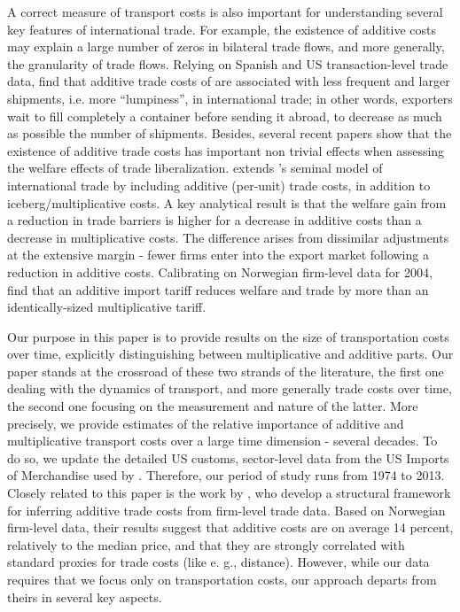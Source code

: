 \documentclass[a4paper,11pt]{article}
\begin{document}
A correct measure of transport costs is also important for understanding several key features of international trade. For example, the existence of additive costs may explain a large number of zeros in bilateral trade flows, and more generally, the granularity of trade flows. Relying on Spanish and US transaction-level trade data, \citet{Hornok14} find that additive trade costs of are associated with less frequent and larger shipments, i.e. more ``lumpiness'', in international trade; in other words, exporters wait to fill completely a container before sending it abroad, to decrease as much as possible the number of shipments. Besides, several recent papers show that the existence of additive trade costs has important non trivial effects when assessing the welfare effects of trade liberalization. \citealp{sorensen2014} extends \citet{melitz}'s seminal model of international trade by including additive (per-unit) trade costs, in addition to iceberg/multiplicative costs. A key analytical result is that the welfare gain from a reduction in trade barriers is higher for a decrease in additive costs than a decrease in multiplicative costs. The difference arises from dissimilar adjustments at the extensive margin - fewer firms enter into the export market following a reduction in additive costs. Calibrating on Norwegian firm-level data for 2004, \citet{Irrazabal_2015} find that an additive import tariff reduces welfare and trade by more than an identically-sized multiplicative tariff.


Our purpose in this paper is to provide results on the size of transportation costs over time, explicitly distinguishing between multiplicative and additive parts. Our paper stands at the crossroad of these two strands of the literature, the first one dealing with the dynamics of transport, and more generally trade costs over time, the second one focusing on the measurement and nature of the latter. More precisely, we provide estimates of the relative importance of additive and multiplicative transport costs over a large time dimension - several decades. To do so, we update the detailed US customs, sector-level data from the US Imports of Merchandise used by \citet{hummels2007}. Therefore, our period of study runs from 1974 to 2013. Closely related to this paper is the work by \citet{Irrazabal_2015}, who develop a structural framework for inferring additive trade costs from firm-level trade data. Based on Norwegian firm-level data, their results suggest that additive costs are on average 14 percent, relatively to the median price, and that they are strongly correlated with standard proxies for trade costs (like e. g., distance). However, while our data requires that we focus only on transportation costs, our approach departs from theirs in several key aspects.
\end{document}
